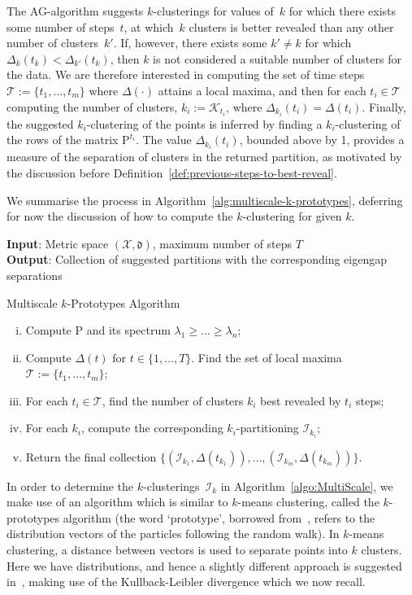 \documentclass{amsart}[11pt]
\numberwithin{equation}{section}
\theoremstyle{definition}
\newcommand{\Kk}{\mathcal{K}}
\newcommand{\Tt}{\mathcal{T}}
\newcommand{\Xx}{\mathcal{X}}
\newcommand{\df}{\mathfrak{d}}
\newcommand{\Pf}{\mathrm{P}}
\begin{document}
The AG-algorithm suggests $k$-clusterings for values of~$k$ for which there exists some number of steps~$t$, 
at which~$k$ clusters is better revealed than any other number of clusters~$k'$. 
If, however, there exists some $k' \neq k$ for which $\Delta_k(t_k) < \Delta_{k'}(t_k)$, then $k$ is not considered a suitable number of clusters for the data. 
We are therefore interested in computing the set of time steps $\Tt := \{t_1, \ldots, t_m\}$ where $\Delta(\cdot)$ attains a local maxima, and then for each $t_i \in \Tt$ computing the number of clusters, $k_i := \Kk_{t_i}$, where $\Delta_{k_i}(t_i) = \Delta(t_i)$. Finally, the suggested $k_i$-clustering of the points is inferred by finding a $k_i$-clustering of the rows of the matrix $\Pf^{t_i}$. The value $\Delta_{k_i}(t_i)$, bounded above by 1, provides a measure of the separation of clusters in the returned partition, as motivated by the discussion before Definition~\ref{def:previous-steps-to-best-reveal}.

We summarise the process in Algorithm~\ref{alg:multiscale-k-prototypes}, deferring for now the discussion of how to compute the $k$-clustering for given $k$.

\begin{algorithm}[ht]\label{algo:MultiScale}
    \label{alg:multiscale-k-prototypes}
    \textbf{Input}: Metric space $(\Xx, \df)$, maximum number of steps $T$\\
    \textbf{Output}: Collection of suggested partitions with the corresponding eigengap separations
    \caption{Multiscale $k$-Prototypes Algorithm}
    \begin{enumerate}[(i)]
        \item Compute $\Pf$ and its spectrum $\lambda_1 \geq \ldots \geq \lambda_n$;
        \item Compute $\Delta(t)$ for $t \in \{1, \ldots, T\}$. Find the set of local maxima $\Tt := \{t_1, \ldots, t_m\}$;
        \item For each $t_i \in \Tt$, find the number of clusters $k_i$ best revealed by $t_i$ steps;
        \item For each $k_i$, compute the corresponding $k_i$-partitioning $\mathcal{I}_{k_i}$;
        \item Return the final collection $\{(\mathcal{I}_{k_1}, \Delta(t_{k_1})), \ldots, (\mathcal{I}_{k_m}, \Delta(t_{k_m}))\}$.
    \end{enumerate}
\end{algorithm}

In order to determine the $k$-clusterings~$\mathcal{I}_k$ in Algorithm~\ref{algo:MultiScale}, we make use of an algorithm which is similar to $k$-means clustering, called the $k$-prototypes algorithm (the word `prototype', borrowed from~\cite{Azran06}, refers to the distribution vectors of the particles following the random walk).
In $k$-means clustering, a distance between vectors is used to separate points into $k$ clusters. Here we have distributions, and hence a slightly different approach is suggested in~\cite{Azran06}, making use of the Kullback-Leibler divergence which we now recall.
\end{document}
